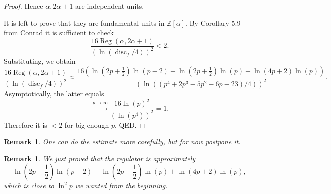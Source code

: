 \documentclass[a4paper]{article}
\newtheorem{Rem}[Thm]{Remark}
\DeclareMathOperator{\Reg}{Reg}        %
\DeclareMathOperator{\disc}{disc}        %
\begin{document}
\begin{proof}
Hence $\alpha, 2\alpha + 1$ are independent units. 

It is left to prove that they are fundamental units in $\mathbb{Z}[\alpha]$.
By Corollary 5.9 from Conrad it is sufficient to check
\[
\frac{16 \Reg(\alpha, 2\alpha + 1) }
{(\ln(\disc_f/4))^2} 
< 2
.\] 
Substituting, we obtain
\[
\frac{16 \Reg(\alpha, 2\alpha + 1) }
{(\ln(\disc_f/4))^2} 
\approx
\frac{16 (
\ln(2 p + \frac{1}{2}) \ln(p - 2) - \ln(2 p + \frac{1}{2}) \ln(p) + \ln(4p + 2) \ln(p)
) }
{(\ln(
(p^4 + 2 p^3 - 5 p^2 - 6 p - 23)
/4))^2} 
.\] 
Asymptotically, the latter equals
\[
\stackrel{p \to \infty}{\longrightarrow}
\frac{16 
\ln(p)^2
}
{(\ln(
p^4 ))^2} = 1
.\] 
Therefore it is $< 2$ for big enough $p$, QED.
\end{proof}
\begin{Rem}
One can do the estimate more carefully, but for now postpone it. 
\end{Rem}
\begin{Rem}
We just proved that the regulator is approximately 
\[
\ln(2 p + \frac{1}{2}) \ln(p - 2) - \ln(2 p + \frac{1}{2}) \ln(p) + \ln(4p + 2) \ln(p)
,\] 
which is close to $\ln^2 p$ we wanted from the beginning.
\end{Rem}
\end{document}
